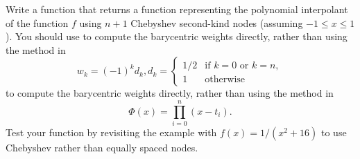\begin{statement}{6}
  Write a function that returns a function representing the polynomial interpolant
  of the function $f$ using $n + 1$ Chebyshev second-kind nodes (assuming $-1 \leq x \leq 1$).
  You should use to compute the barycentric weights directly, rather than using the method in
  \[
    w_k = (-1)^k d_k,
    d_k = \begin{cases}
      1/2 & \text{if $k = 0$ or $k = n$},\\
      1 & \text{otherwise}
    \end{cases}
  \]
  to compute the barycentric weights directly, rather than using the method in
  \[
    \Phi(x) = \prod_{i = 0}^n (x - t_i).
  \]
  Test your function by revisiting the example with $f(x) = 1 / (x^2 + 16)$ to
  use Chebyshev rather than equally spaced nodes.
\end{statement}